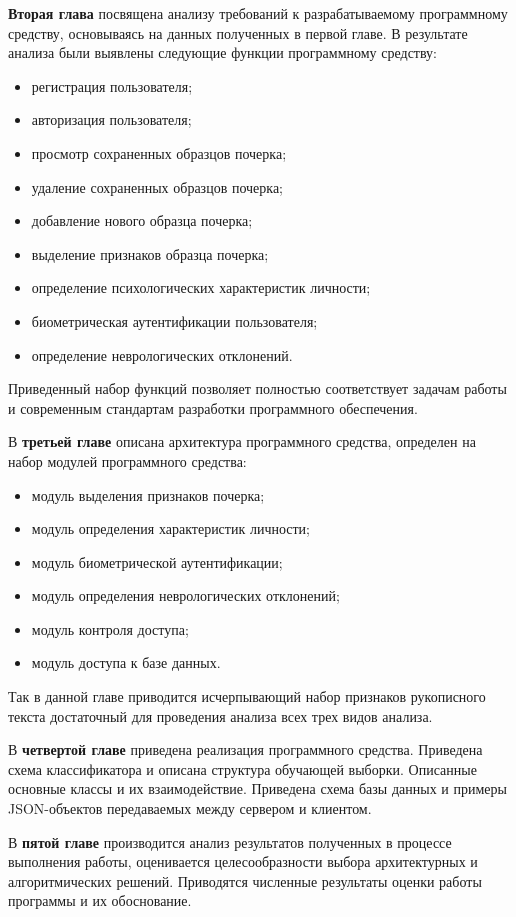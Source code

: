 \textbf{Вторая глава} посвящена анализу требований к разрабатываемому программному средству, основываясь на данных полученных в первой главе. В результате анализа были выявлены следующие функции программному средству:
\begin{itemize}
	\item регистрация пользователя;
	\item авторизация пользователя;
	\item просмотр сохраненных образцов почерка;
	\item удаление сохраненных образцов почерка;
	\item добавление нового образца почерка;
	\item выделение признаков образца почерка;
	\item определение психологических характеристик личности;
	\item биометрическая аутентификации пользователя;
	\item определение неврологических отклонений.
\end{itemize}

Приведенный набор функций позволяет полностью соответствует задачам работы и современным стандартам разработки программного обеспечения.

В \textbf{третьей главе} описана архитектура программного средства, определен на набор модулей программного средства:
\begin{itemize}
    \item модуль выделения признаков почерка;
    \item модуль определения характеристик личности;
    \item модуль биометрической аутентификации;
    \item модуль определения неврологических отклонений;
    \item модуль контроля доступа;
    \item модуль доступа к базе данных.
\end{itemize}

Так в данной главе приводится исчерпывающий набор признаков рукописного текста достаточный для проведения анализа всех трех видов анализа.

В \textbf{четвертой главе} приведена реализация программного средства. Приведена схема классификатора и описана структура обучающей выборки. Описанные основные классы и их взаимодействие. Приведена схема базы данных и примеры JSON-объектов передаваемых между сервером и клиентом.

В \textbf{пятой главе} производится анализ результатов полученных в процессе выполнения работы, оценивается целесообразности выбора архитектурных и алгоритмических решений. Приводятся численные результаты оценки работы программы и их обоснование.

